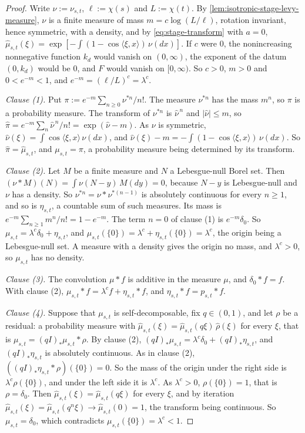 \begin{proof}
\leanok
Write $\nu := \nu_{s,t}$, $\ell := \chi(s)$ and $L := \chi(t)$. By
\ref{lem:isotropic-stage-levy-measure}, $\nu$ is a finite measure of mass
$m = c\log(L/\ell)$, rotation invariant, hence symmetric, with a density, and by
\ref{eq:stage-transform} with $a = 0$,
$\widehat\mu_{s,t}(\xi) = \exp[-\int(1 - \cos\langle\xi,x\rangle)\,\nu(dx)]$. If $c$ were $0$,
the nonincreasing nonnegative function $k_d$ would vanish on $(0,\infty)$, the exponent of the
datum $(0,k_d)$ would be $0$, and $F$ would vanish on $[0,\infty)$. So $c > 0$, $m > 0$ and
$0 < e^{-m} < 1$, and $e^{-m} = (\ell/L)^c = \lambda^c$.

\emph{Clause (1).} Put $\pi := e^{-m}\sum_{n \ge 0}\nu^{*n}/n!$. The measure $\nu^{*n}$ has the
mass $m^n$, so $\pi$ is a probability measure. The transform of $\nu^{*n}$ is $\widehat\nu^{\,n}$
and $|\widehat\nu| \le m$, so $\widehat\pi = e^{-m}\sum_n\widehat\nu^{\,n}/n!
= \exp(\widehat\nu - m)$. As $\nu$ is symmetric, $\widehat\nu(\xi) = \int\cos\langle\xi,x\rangle
\,\nu(dx)$, and $\widehat\nu(\xi) - m = -\int(1 - \cos\langle\xi,x\rangle)\,\nu(dx)$. So
$\widehat\pi = \widehat\mu_{s,t}$, and $\mu_{s,t} = \pi$, a probability measure being determined
by its transform.

\emph{Clause (2).} Let $M$ be a finite measure and $N$ a Lebesgue-null Borel set. Then
$(\nu * M)(N) = \int\nu(N - y)\,M(dy) = 0$, because $N - y$ is Lebesgue-null and $\nu$ has a
density. So $\nu^{*n} = \nu * \nu^{*(n-1)}$ is absolutely continuous for every $n \ge 1$, and so
is $\eta_{s,t}$, a countable sum of such measures. Its mass is
$e^{-m}\sum_{n \ge 1}m^n/n! = 1 - e^{-m}$. The term $n = 0$ of clause (1) is $e^{-m}\delta_0$.
So $\mu_{s,t} = \lambda^c\delta_0 + \eta_{s,t}$, and
$\mu_{s,t}(\{0\}) = \lambda^c + \eta_{s,t}(\{0\}) = \lambda^c$, the origin being a Lebesgue-null
set. A measure with a density gives the origin no mass, and $\lambda^c > 0$, so $\mu_{s,t}$ has
no density.

\emph{Clause (3).} The convolution $\mu * f$ is additive in the measure $\mu$, and
$\delta_0 * f = f$. With clause (2),
$\mu_{s,t} * f = \lambda^c f + \eta_{s,t} * f$, and $\eta_{s,t} * f = p_{s,t} * f$.

\emph{Clause (4).} Suppose that $\mu_{s,t}$ is self-decomposable, fix $q \in (0,1)$, and let
$\rho$ be a residual: a probability measure with
$\widehat\mu_{s,t}(\xi) = \widehat\mu_{s,t}(q\xi)\,\widehat\rho(\xi)$ for every $\xi$, that is
$\mu_{s,t} = (qI)_*\mu_{s,t} * \rho$. By clause (2),
$(qI)_*\mu_{s,t} = \lambda^c\delta_0 + (qI)_*\eta_{s,t}$, and $(qI)_*\eta_{s,t}$ is absolutely
continuous. As in clause (2), $((qI)_*\eta_{s,t} * \rho)(\{0\}) = 0$. So the mass of the origin
under the right side is $\lambda^c\rho(\{0\})$, and under the left side it is $\lambda^c$. As
$\lambda^c > 0$, $\rho(\{0\}) = 1$, that is $\rho = \delta_0$. Then
$\widehat\mu_{s,t}(\xi) = \widehat\mu_{s,t}(q\xi)$ for every $\xi$, and by iteration
$\widehat\mu_{s,t}(\xi) = \widehat\mu_{s,t}(q^n\xi) \to \widehat\mu_{s,t}(0) = 1$, the transform
being continuous. So $\mu_{s,t} = \delta_0$, which contradicts $\mu_{s,t}(\{0\}) = \lambda^c < 1$.


\end{proof}
